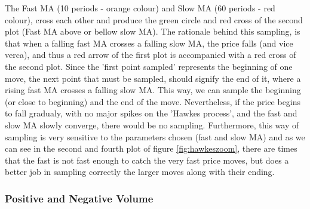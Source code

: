 The Fast MA (10 periods - orange colour) and Slow MA (60 periods - red colour), cross each other and produce the green circle and red cross of the second plot (Fast MA above or bellow slow MA). The rationale behind this sampling, is that when a falling fast MA crosses a falling slow MA, the price falls (and vice verca), and thus a red arrow of the first plot is accompanied with a red cross of the second plot. Since the 'first point sampled' represents the beginning of one move, the next point that must be sampled, should signify the end of it, where a rising fast MA crosses a falling slow MA. This way, we can sample the beginning (or close to beginning) and the end of the move. Nevertheless, if the price begins to fall gradualy, with no major spikes on the 'Hawkes process', and the fast and slow MA slowly converge, there would be no sampling. Furthermore, this way of sampling is very sensitive to the parameters chosen (fast and slow MA) and as we can see in the second and fourth plot of figure \ref{fig:hawkeszoom}, there are times that the fast is not fast enough to catch the very fast price moves, but does a better job in sampling correctly the larger moves along with their ending.

\subsubsection{Positive and Negative Volume}





